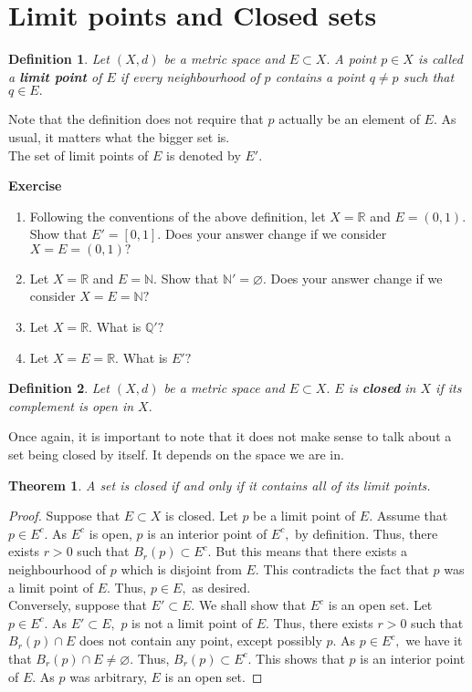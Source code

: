 \documentclass{article}
\newtheorem{theorem}{Theorem}
\newtheorem{defn}{Definition}
\let\emptyset\varnothing
\newcounter{exercise}
\newcommand{\exercise}{\refstepcounter{exercise}\par\medskip
   {\textbf{Exercise \theexercise }} \rmfamily}
\begin{document}
	\section{Limit points and Closed sets}
	\begin{defn}
		Let $(X, d)$ be a metric space and $E \subset X.$ A point $p \in X$ is called a \textbf{limit point} of $E$ if \emph{every} neighbourhood of $p$ contains a point $q \neq p$ such that $q \in E.$
	\end{defn}
	Note that the definition does not require that $p$ actually be an element of $E.$ As usual, it matters what the bigger set is.\\
	The set of limit points of $E$ is denoted by $E'.$
	\exercise
	\begin{enumerate}[nosep] 
		\item Following the conventions of the above definition, let $X = \mathbb{R}$ and $E = (0, 1).$ Show that $E' = [0, 1].$ Does your answer change if we consider $X = E = (0, 1)?$
		\item Let $X = \mathbb{R}$ and $E = \mathbb{N}.$ Show that $\mathbb{N}' = \emptyset.$ Does your answer change if we consider $X = E = \mathbb{N}?$
		\item Let $X = \mathbb{R}.$ What is $\mathbb{Q}'?$
		\item Let $X = E = \mathbb{R}.$ What is $E'?$
	\end{enumerate}
	\begin{defn}
		Let $(X, d)$ be a metric space and $E \subset X.$ $E$ is \textbf{closed} in $X$ if its complement is open in $X.$
	\end{defn}
	Once again, it is important to note that it does not make sense to talk about a set being closed by itself. It depends on the space we are in. \\
	\begin{theorem}
		A set is closed if and only if it contains all of its limit points.
	\end{theorem}
	\begin{proof}
		Suppose that $E \subset X$ is closed. Let $p$ be a limit point of $E.$ Assume that $p \in E^c.$ As $E^c$ is open, $p$ is an interior point of $E^c,$ by definition. Thus, there exists $r > 0$ such that $B_r(p) \subset E^c.$ But this means that there exists a neighbourhood of $p$ which is disjoint from $E.$ This contradicts the fact that $p$ was a limit point of $E.$ Thus, $p \in E,$ as desired.\\
		Conversely, suppose that $E' \subset E.$ We shall show that $E^c$ is an open set. Let $p \in E^c.$ As $E' \subset E,$ $p$ is not a limit point of $E.$ Thus, there exists $r > 0$ such that $B_r(p) \cap E$ does not contain any point, except possibly $p.$ As $p \in E^c,$ we have it that $B_r(p) \cap E \neq \emptyset.$ Thus, $B_r(p) \subset E^c.$ This shows that $p$ is an interior point of $E.$ As $p$ was arbitrary, $E$ is an open set. 
	\end{proof}
\end{document}
